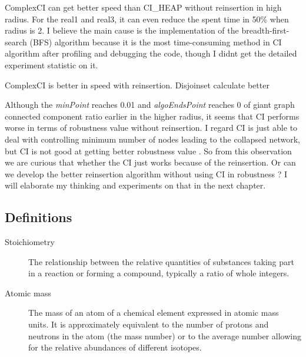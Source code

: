 \documentclass{article}
\begin{document}
\begin{enumerate}
\begin{item}
\begin{enumerate}
				
			\end{enumerate}			
			
			
		\end{item}	
	
		\begin{item}
			ComplexCI can get better speed than CI\_HEAP without reinsertion in high radius. For the real1 and real3, it can even reduce the spent time in 50\% when radius is 2. I believe the main cause is the implementation of the breadth-first-search (BFS) algorithm because it is the most time-consuming method in CI algorithm after profiling and debugging the code, though I didn\textquotesingle t get the detailed experiment statistic on it. 	
		\end{item}	
	
	
		\begin{item}	
			ComplexCI is better in speed with reinsertion. Disjoinset calculate better 
		\end{item}	
	
		\begin{item}	
			Although the \textit{minPoint} reaches 0.01 and \textit{algoEndsPoint} reaches 0 of giant graph connected component ratio earlier in the higher radius, it seems that CI performs worse in terms of robustness value without reinsertion. I regard CI is just able to deal with controlling minimum number of nodes leading to the collapsed network, but CI is not good at getting better robustness value . So from this observation we are curious that whether the CI just works because of the reinsertion. Or can we develop the better reinsertion algorithm without using CI in robustness ? I will elaborate my thinking and experiments on that in the next chapter.	
		\end{item}		
		
	\end{enumerate}
	







		
	\subsection{Definitions}
	\label{definitions}
	\begin{description}
		\item[Stoichiometry]
		The relationship between the relative quantities of substances taking part in a reaction or forming a compound, typically a ratio of whole integers.
		\item[Atomic mass]
		The mass of an atom of a chemical element expressed in atomic mass units. It is approximately equivalent to the number of protons and neutrons in the atom (the mass number) or to the average number allowing for the relative abundances of different isotopes. 
	\end{description} 
	
\end{document}
